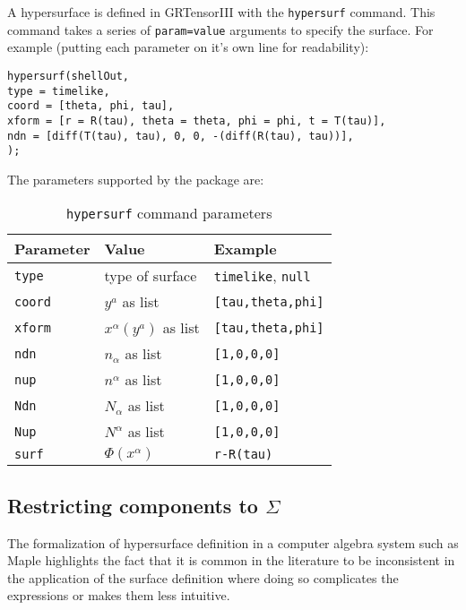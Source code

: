 \documentclass{article}
\begin{document}
A hypersurface is defined in GRTensorIII with the \texttt{hypersurf} command. This command takes a series of
\texttt{param=value} arguments to specify the surface. For example (putting each parameter on it's own line for readability):

\begin{verbatim}
hypersurf(shellOut, 
type = timelike, 
coord = [theta, phi, tau], 
xform = [r = R(tau), theta = theta, phi = phi, t = T(tau)], 
ndn = [diff(T(tau), tau), 0, 0, -(diff(R(tau), tau))], 
);                
\end{verbatim}

The parameters supported by the package are:
\renewcommand{\arraystretch}{1.5}
\begin{table}[ht]
  \begin{center}
    \begin{tabular}{lll}\hline\hline
      \textbf{Parameter} & \textbf{Value} & Example \\ \hline
\texttt{type} & type of surface & \texttt{timelike}, \texttt{null} \\
\texttt{coord} & $y^a$ as list & \texttt{[tau,theta,phi]} \\
\texttt{xform} & $x^\alpha(y^a)$ as list & \texttt{[tau,theta,phi]} \\
\texttt{ndn} & $n_\alpha$ as list & \texttt{[1,0,0,0]} \\
\texttt{nup} & $n^\alpha$ as list & \texttt{[1,0,0,0]} \\
\texttt{Ndn} & $N_\alpha$ as list & \texttt{[1,0,0,0]} \\
\texttt{Nup} & $N^\alpha$ as list & \texttt{[1,0,0,0]} \\
\texttt{surf} & $\Phi(x^\alpha)$ & \texttt{r-R(tau)} \\
    \end{tabular}
    \caption{\texttt{hypersurf} command parameters}
    \label{tab:hypersurf}
  \end{center}
\end{table}

\subsection{Restricting components to $\Sigma$}
The formalization of hypersurface definition in a computer algebra system such as Maple highlights the
fact that it is common in the literature to be inconsistent in the application of the surface definition where
doing so complicates the expressions or makes them less intuitive. \\
\end{document}
